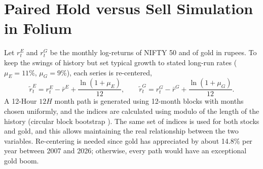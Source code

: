 \section{Paired Hold versus Sell Simulation in Folium}
Let $r^E_t$ and $r^G_t$ be the monthly log-returns of NIFTY 50 and of gold in rupees. To keep the swings of history but set typical growth to stated long-run rates ($\mu_E = 11\%$, $\mu_G = 9\%$), each series is re-centered,
\begin{equation}
\tilde{r}^E_t = r^E_t - \bar{r}^E + \frac{\ln(1+\mu_E)}{12}, \qquad \tilde{r}^G_t = r^G_t - \bar{r}^G + \frac{\ln(1+\mu_G)}{12}.
\end{equation}
A 12-Hour $12H$ month path is generated using 12-month blocks with months chosen uniformly, and the indices are calculated using modulo of the length of the history (circular block bootstrap \cite{b12,b33}). The same set of indices is used for both stocks and gold, and this allows maintaining the real relationship between the two variables. Re-centering is needed since gold has appreciated by about 14.8\% per year between 2007 and 2026; otherwise, every path would have an exceptional gold boom.

